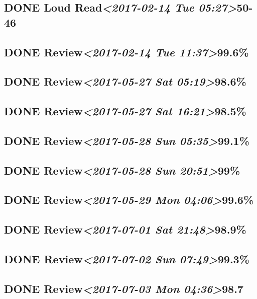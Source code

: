 \documentclass[11pt]{ctexart}
\begin{document}
\subsection{{\bfseries\sffamily DONE} Loud Read\textit{<2017-02-14 Tue 05:27>}50-46}
\label{sec:org784c73d}
\subsection{{\bfseries\sffamily DONE} Review\textit{<2017-02-14 Tue 11:37>}99.6\%}
\label{sec:orgab2e8ee}
\subsection{{\bfseries\sffamily DONE} Review\textit{<2017-05-27 Sat 05:19>}98.6\%}
\label{sec:org9073425}
\subsection{{\bfseries\sffamily DONE} Review\textit{<2017-05-27 Sat 16:21>}98.5\%}
\label{sec:org351732f}
\subsection{{\bfseries\sffamily DONE} Review\textit{<2017-05-28 Sun 05:35>}99.1\%}
\label{sec:orgf954da4}
\subsection{{\bfseries\sffamily DONE} Review\textit{<2017-05-28 Sun 20:51>}99\%}
\label{sec:org8e2ec76}
\subsection{{\bfseries\sffamily DONE} Review\textit{<2017-05-29 Mon 04:06>}99.6\%}
\label{sec:orgf21d722}
\subsection{{\bfseries\sffamily DONE} Review\textit{<2017-07-01 Sat 21:48>}98.9\%}
\label{sec:orgef7ec93}
\subsection{{\bfseries\sffamily DONE} Review\textit{<2017-07-02 Sun 07:49>}99.3\%}
\label{sec:org75e4d47}
\subsection{{\bfseries\sffamily DONE} Review\textit{<2017-07-03 Mon 04:36>}98.7}
\label{sec:org98a1de3}
\end{document}
